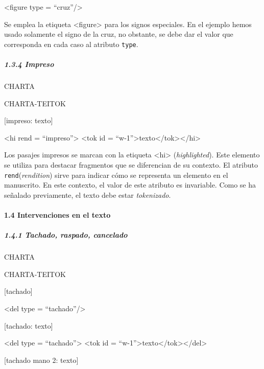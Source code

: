 \documentclass[
]{book}
\begin{document}
{\textless figure} {type} {=} {``cruz''}{/\textgreater{}}

Se emplea la etiqueta { \textless figure\textgreater{}} para los signos especiales. En el ejemplo hemos usado solamente el signo de la cruz, no obstante, se debe dar el valor que corresponda en cada caso al atributo \texttt{type}.

\hypertarget{impreso}{%
\subparagraph*{1.3.4 Impreso}\label{impreso}}

CHARTA

CHARTA-TEITOK

{[}impreso: texto{]}

{\textless hi} {rend} {=} {``impreso''}{\textgreater{}} {\textless tok} {id} {=} {``w-1''}{\textgreater{}}texto{\textless/tok\textgreater{}}{\textless/hi\textgreater{}}

Los pasajes impresos se marcan con la etiqueta { \textless hi\textgreater{}} (\emph{highlighted}). Este elemento se utiliza para destacar fragmentos que se diferencian de su contexto. El atributo \texttt{rend}(\emph{rendition}) sirve para indicar cómo se representa un elemento en el manuscrito. En este contexto, el valor de este atributo es invariable. Como se ha señalado previamente, el texto debe estar \emph{tokenizado}.

\hypertarget{intervenciones-en-el-texto}{%
\paragraph*{1.4 Intervenciones en el texto}\label{intervenciones-en-el-texto}}

\hypertarget{tachado-raspado-cancelado}{%
\subparagraph*{1.4.1 Tachado, raspado, cancelado}\label{tachado-raspado-cancelado}}

CHARTA

CHARTA-TEITOK

{[}tachado{]}

{\textless del} {type} {=} {``tachado''}{/\textgreater{}}

{[}tachado: texto{]}

{\textless del} {type} {=} {``tachado''}{\textgreater{}} {\textless tok} {id} {=} {``w-1''}{\textgreater{}}texto{\textless/tok\textgreater{}}{\textless/del\textgreater{}}

{[}tachado mano 2: texto{]}
\end{document}
